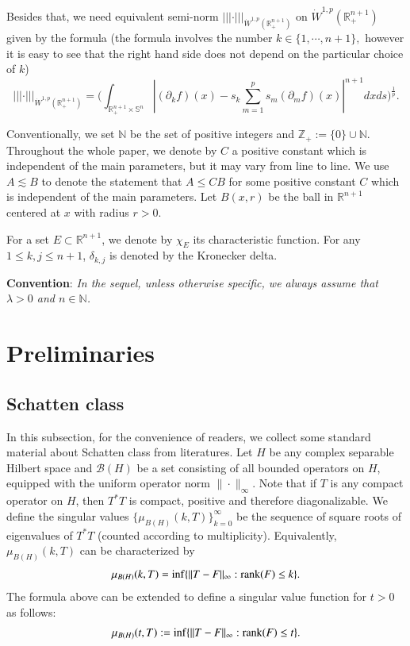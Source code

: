 \documentclass{amsart}
\begin{document}
Besides that, we need equivalent semi-norm $|||\cdot|||_{\dot{W}^{1,p}(\mathbb{R}_+^{n+1})}$ on $\dot{W}^{1,p}(\mathbb{R}_+^{n+1})$ given by the formula (the formula involves the number $k\in\{1,\cdots,n+1\},$ however it is easy to see that the right hand side does not depend on the particular choice of $k$)
$$|||\cdot|||_{\dot{W}^{1,p}(\mathbb{R}_+^{n+1})}=\Big(\int_{\mathbb{R}^{n+1}_+\times\mathbb{S}^n}|(\partial_kf)(x)-s_k\sum_{m=1}^ps_m(\partial_mf)(x)|^{n+1}dxds\Big)^{\frac1p}.$$



Conventionally, we set $\mathbb{N}$ be the set of positive integers and $\mathbb{Z}_+:=\{0\}\cup\mathbb{N}$. Throughout the whole paper, we denote by $C$ a positive constant which is independent of the main parameters, but it may
vary from line to line. We use $A\lesssim B$ to denote the statement that $A\leq CB$ for some positive constant $C$ which is independent of the main parameters. Let $B(x,r)$ be the ball in $\mathbb{R}^{n+1}$ centered at $x$ with radius $r>0$.

For a set $E \subset \mathbb{R}^{n+1}$, we denote by $\chi_E$ its characteristic function. For any $1\leq k,j\leq n+1$, $\delta_{k,j}$ is denoted by the Kronecker delta.

{\bf Convention}: {\it In the sequel, unless  otherwise specific, we always assume that $\lambda>0$ and $n\in \mathbb{N}$.}
\section{Preliminaries}
\setcounter{equation}{0}
\subsection{Schatten class}\label{Spdef}
In this subsection, for the convenience of readers, we collect some standard material about Schatten class from literatures. Let $H$ be any complex separable Hilbert space and $\mathcal{B}(H)$ be a set consisting of all bounded operators on $H$,  equipped with the uniform operator norm $\|\cdot\|_\infty$.  Note that if $T$ is any compact operator on $H$, then $T^{*}T$ is compact, positive and therefore diagonalizable. We define the singular values $\{\mu_{B(H)}(k,T)\}_{k=0}^{\infty}$ be the sequence of square roots of eigenvalues of $T^{*}T$ (counted according to multiplicity). Equivalently, $\mu_{B(H)}(k,T)$ can be characterized by
\begin{align*}
\mu_{B(H)}(k,T)=\inf\{\|T-F\|_\infty:{\rm rank}(F)\leq k\}.
\end{align*}
The formula above can be extended to define a singular value function for $t>0$ as follows:
\begin{align*}
\mu_{B(H)}(t,T):=\inf\{\|T-F\|_\infty:{\rm rank}(F)\leq t\}.
\end{align*}
\end{document}
